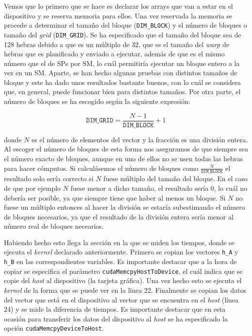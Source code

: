 \documentclass[11pt,a4paper]{article}
\begin{document}
Vemos que lo primero que se hace es declarar los arrays que van a estar en el dispositivo
y se reserva memoria para ellos. Una vez reservada la memoria se procede a
determinar el tamaño del bloque (\texttt{DIM\_BLOCK}) y el número de bloques o tamaño del
\textit{grid} (\texttt{DIM\_GRID}). Se ha especificado que el tamaño del bloque sea de 128
hebras debido a que es un múltiplo de 32, que es el tamaño del \textit{warp} de hebras que
es planificado y enviado a ejecutar, además de que es el mismo número que el de SPs por SM,
lo cuál permitiría ejecutar un bloque entero a la vez en un SM. Aparte, se han hecho algunas
pruebas con distintos tamaños de bloque y este ha dado unos resultados bastante buenos, con lo
cuál se considera que, en general, puede funcionar bien para distintos tamaños. Por otra parte,
el número de bloques se ha escogido según la siguiente expresión:

\begin{equation}
\texttt{DIM\_GRID} = \frac{N - 1}{\texttt{DIM\_BLOCK}} + 1
\label{eq:dim-grid}
\end{equation}

\noindent donde $N$ es el número de elementos del vector y la fracción es una división
entera. Al escoger el número de bloques de esta forma nos aseguramos de que siempre sea
el número exacto de bloques, aunque en uno de ellos no se usen todas las hebras para hacer
cómputos. Si calculásemos el número de bloques como $\frac{N}{\texttt{DIM\_BLOCK}}$ el resultado
solo sería correcto si $N$ fuese múltiplo del tamaño del bloque. En el caso de que por ejemplo
$N$ fuese menor a dicho tamaño, el resultado sería 0, lo cuál no debería ser posible,
ya que siempre tiene que haber al menos un bloque. Si $N$ no fuese un múltiplo entonces al
hacer la división se estaría subestimando el número de bloques necesarios, ya que el resultado
de la división entera sería menor al número real de bloques necearios.

Habiendo hecho esto llega la sección en la que se miden los tiempos, donde se ejecuta el
\textit{kernel} declarado anteriormente. Primero se copian los vectores \texttt{h\_A}
y \texttt{h\_B} en las correspondientes variables. Es importante destacar que a la hora
de copiar se especifica el parámetro \texttt{cudaMemcpyHostToDevice}, el cuál indica que
se copie del \textit{host} al dispositivo (la tarjeta gráfica). Una vez hecho esto
se ejecuta el \textit{kernel} de la forma que se puede ver en la línea 22.
Finalmente se copian los datos del vector que está en el dispositivo al vector que se encuentra
en el \textit{host} (línea 24) y se mide la diferencia de tiempos. Es importante destacar que en
esta ocasión para transferir los datos del dispositivo al \textit{host} se ha especificado la
opción \texttt{cudaMemcpyDeviceToHost}.
\end{document}
